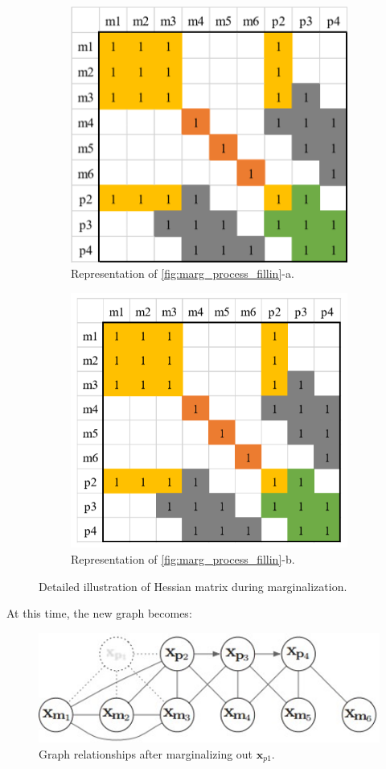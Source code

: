 \documentclass[12pt]{report}   %
\begin{document}
\begin{figure}[H]
\begin{subfigure}[t]{.4\linewidth}
	\centering\includegraphics[width=.8\linewidth]{figures/marg_03.png}
	\caption{Representation of \ref{fig:marg_process_fillin}-a.}
\end{subfigure}
\begin{subfigure}[t]{.4\linewidth}
	\centering\includegraphics[width=.8\linewidth]{figures/marg_04.png}
	\caption{Representation of \ref{fig:marg_process_fillin}-b.}
\end{subfigure}
\caption{Detailed illustration of Hessian matrix during marginalization.}
\end{figure}

At this time, the new graph becomes:


\begin{figure}[H]
	\centering
	\includegraphics[width=.6\linewidth]{figures/after_marg.png}
	\caption{Graph relationships after marginalizing out $\bm{x}_{p1}$.}
	\label{fig:after_marg}
\end{figure}
\end{document}
